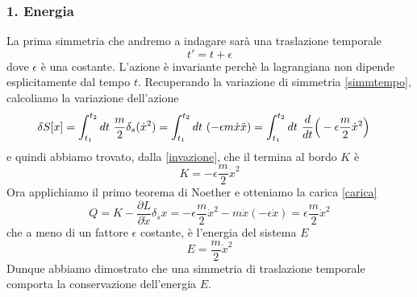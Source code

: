 \begin{example}
\subsubsection{1. Energia}
    La prima simmetria che andremo a indagare sarà una traslazione temporale
\begin{equation}
    t' = t + \epsilon
\end{equation}
    dove $\epsilon$ è una costante. L'azione è invariante perchè la lagrangiana non dipende esplicitamente dal tempo $t$. Recuperando la variazione di simmetria \eqref{simmtempo}, calcoliamo la variazione dell'azione
\begin{equation}
\begin{aligned}
    \delta S[x] & = \int_{t_1}^{t_2}dt~ \frac{m}{2} \delta_s (\dot x^2) = \int_{t_1}^{t_2}dt~ ( - \epsilon m \dot x \ddot x) = \int_{t_1}^{t_2}dt~ \frac{d}{dt} \Big( -\epsilon \frac{m}{2} \dot x^2 \Big)
\end{aligned}
\end{equation}
    e quindi abbiamo trovato, dalla \eqref{invazione}, che il termina al bordo $K$ è 
\begin{equation*}
    K = - \epsilon \frac{m}{2} \dot x^2 
\end{equation*}
    Ora applichiamo il primo teorema di Noether e otteniamo la carica \eqref{carica} 
\begin{equation}
    Q = K - \frac{\partial L}{\partial \dot x} \delta_s x = - \epsilon \frac{m}{2} \dot x^2 - m \dot x (-\epsilon \dot x) = \epsilon \frac{m}{2} \dot x^2
\end{equation}
    che a meno di un fattore $\epsilon$ costante, è l'energia del sistema $E$
\begin{equation*}
    E = \frac{m}{2} \dot x^2
\end{equation*}
    Dunque abbiamo dimostrato che una simmetria di traslazione temporale comporta la conservazione dell'energia $E$.


\end{example}
